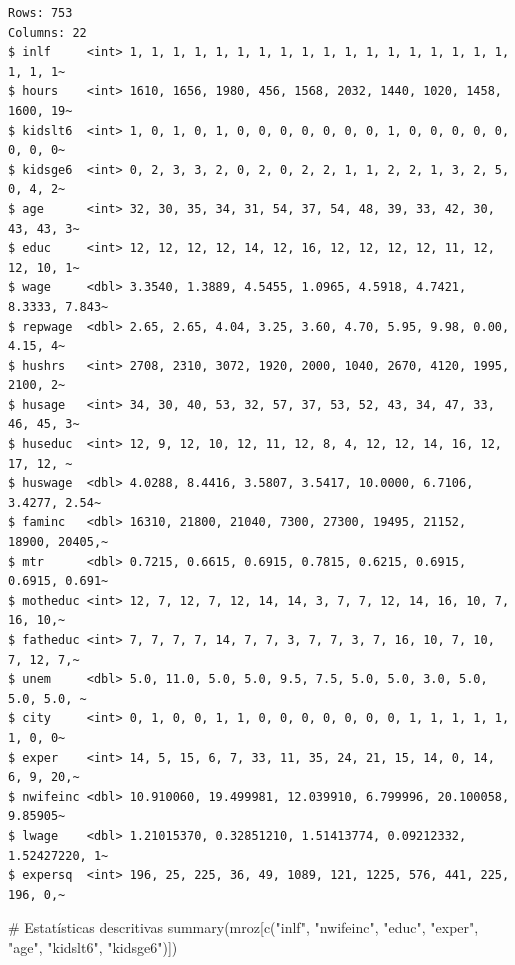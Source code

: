 \documentclass[
  letterpaper,
  DIV=11,
  numbers=noendperiod]{scrartcl}
\newenvironment{Shaded}{\begin{snugshade}}{\end{snugshade}}
\newcommand{\CommentTok}[1]{\textcolor[rgb]{0.37,0.37,0.37}{#1}}
\newcommand{\FunctionTok}[1]{\textcolor[rgb]{0.28,0.35,0.67}{#1}}
\newcommand{\NormalTok}[1]{\textcolor[rgb]{0.00,0.23,0.31}{#1}}
\newcommand{\StringTok}[1]{\textcolor[rgb]{0.13,0.47,0.30}{#1}}
\begin{document}
\begin{verbatim}
Rows: 753
Columns: 22
$ inlf     <int> 1, 1, 1, 1, 1, 1, 1, 1, 1, 1, 1, 1, 1, 1, 1, 1, 1, 1, 1, 1, 1~
$ hours    <int> 1610, 1656, 1980, 456, 1568, 2032, 1440, 1020, 1458, 1600, 19~
$ kidslt6  <int> 1, 0, 1, 0, 1, 0, 0, 0, 0, 0, 0, 0, 1, 0, 0, 0, 0, 0, 0, 0, 0~
$ kidsge6  <int> 0, 2, 3, 3, 2, 0, 2, 0, 2, 2, 1, 1, 2, 2, 1, 3, 2, 5, 0, 4, 2~
$ age      <int> 32, 30, 35, 34, 31, 54, 37, 54, 48, 39, 33, 42, 30, 43, 43, 3~
$ educ     <int> 12, 12, 12, 12, 14, 12, 16, 12, 12, 12, 12, 11, 12, 12, 10, 1~
$ wage     <dbl> 3.3540, 1.3889, 4.5455, 1.0965, 4.5918, 4.7421, 8.3333, 7.843~
$ repwage  <dbl> 2.65, 2.65, 4.04, 3.25, 3.60, 4.70, 5.95, 9.98, 0.00, 4.15, 4~
$ hushrs   <int> 2708, 2310, 3072, 1920, 2000, 1040, 2670, 4120, 1995, 2100, 2~
$ husage   <int> 34, 30, 40, 53, 32, 57, 37, 53, 52, 43, 34, 47, 33, 46, 45, 3~
$ huseduc  <int> 12, 9, 12, 10, 12, 11, 12, 8, 4, 12, 12, 14, 16, 12, 17, 12, ~
$ huswage  <dbl> 4.0288, 8.4416, 3.5807, 3.5417, 10.0000, 6.7106, 3.4277, 2.54~
$ faminc   <dbl> 16310, 21800, 21040, 7300, 27300, 19495, 21152, 18900, 20405,~
$ mtr      <dbl> 0.7215, 0.6615, 0.6915, 0.7815, 0.6215, 0.6915, 0.6915, 0.691~
$ motheduc <int> 12, 7, 12, 7, 12, 14, 14, 3, 7, 7, 12, 14, 16, 10, 7, 16, 10,~
$ fatheduc <int> 7, 7, 7, 7, 14, 7, 7, 3, 7, 7, 3, 7, 16, 10, 7, 10, 7, 12, 7,~
$ unem     <dbl> 5.0, 11.0, 5.0, 5.0, 9.5, 7.5, 5.0, 5.0, 3.0, 5.0, 5.0, 5.0, ~
$ city     <int> 0, 1, 0, 0, 1, 1, 0, 0, 0, 0, 0, 0, 0, 1, 1, 1, 1, 1, 1, 0, 0~
$ exper    <int> 14, 5, 15, 6, 7, 33, 11, 35, 24, 21, 15, 14, 0, 14, 6, 9, 20,~
$ nwifeinc <dbl> 10.910060, 19.499981, 12.039910, 6.799996, 20.100058, 9.85905~
$ lwage    <dbl> 1.21015370, 0.32851210, 1.51413774, 0.09212332, 1.52427220, 1~
$ expersq  <int> 196, 25, 225, 36, 49, 1089, 121, 1225, 576, 441, 225, 196, 0,~
\end{verbatim}

\begin{Shaded}
\begin{Highlighting}[]
\CommentTok{\# Estatísticas descritivas}
\FunctionTok{summary}\NormalTok{(mroz[}\FunctionTok{c}\NormalTok{(}\StringTok{"inlf"}\NormalTok{, }\StringTok{"nwifeinc"}\NormalTok{, }\StringTok{"educ"}\NormalTok{, }\StringTok{"exper"}\NormalTok{, }\StringTok{"age"}\NormalTok{, }\StringTok{"kidslt6"}\NormalTok{, }\StringTok{"kidsge6"}\NormalTok{)])}
\end{Highlighting}
\end{Shaded}
\end{document}
